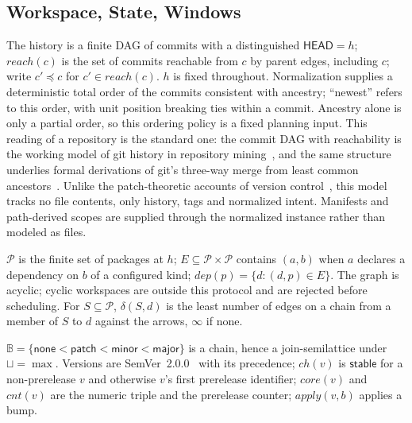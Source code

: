 \subsection{Workspace, State, Windows}

\begin{definition}[history]
The history is a finite DAG of commits with a distinguished
$\mathsf{HEAD} = h$; $\mathit{reach}(c)$ is the set of commits reachable
from $c$ by parent edges, including $c$; write $c' \preceq c$ for
$c' \in \mathit{reach}(c)$. $h$ is fixed throughout. Normalization supplies a deterministic total order
of the commits consistent with ancestry; ``newest'' refers to this order,
with unit position breaking ties within a commit. Ancestry alone is only a
partial order, so this ordering policy is a fixed planning input. This reading of a
repository is the standard one: the commit DAG with reachability is the
working model of git history in repository mining~\cite{birdgit}, and
the same structure underlies formal derivations of git's three-way
merge from least common ancestors~\cite{mrdt}. Unlike the
patch-theoretic accounts of version
control~\cite{swierstraloh,hpt,mimram}, this model tracks no file
contents, only history, tags and normalized intent. Manifests and path-derived
scopes are supplied through the normalized instance rather than modeled as files.
\end{definition}

\begin{definition}[workspace]
$\mathcal{P}$ is the finite set of packages at $h$; $E \subseteq
\mathcal{P} \times \mathcal{P}$ contains $(a,b)$ when $a$ declares a
dependency on $b$ of a configured kind; $\mathit{dep}(p) = \{d : (d,p)
\in E\}$. The graph is acyclic; cyclic workspaces are outside this protocol
and are rejected before scheduling. For $S \subseteq
\mathcal{P}$, $\delta(S,d)$ is the least number of edges on a chain from
a member of $S$ to $d$ against the arrows, $\infty$ if none.
\end{definition}

\begin{definition}
$\mathbb{B} = \{\mathsf{none} < \mathsf{patch} < \mathsf{minor} <
\mathsf{major}\}$ is a chain, hence a join-semilattice under
$\sqcup = \max$. Versions are SemVer~2.0.0~\cite{semver} with its
precedence; $\mathit{ch}(v)$ is $\mathsf{stable}$ for a non-prerelease
$v$ and otherwise $v$'s first prerelease identifier; $\mathit{core}(v)$
and $\mathit{cnt}(v)$ are the numeric triple and the prerelease counter;
$\mathit{apply}(v,b)$ applies a bump.
\end{definition}

